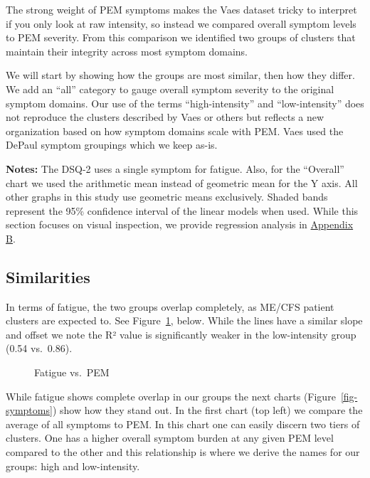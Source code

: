 \documentclass[
  letterpaper,
  DIV=11,
  numbers=noendperiod]{scrartcl}
\begin{document}
The strong weight of PEM symptoms makes the Vaes dataset tricky to
interpret if you only look at raw intensity, so instead we compared
overall symptom levels to PEM severity. From this comparison we
identified two groups of clusters that maintain their integrity across
most symptom domains.

We will start by showing how the groups are most similar, then how they
differ. We add an ``all'' category to gauge overall symptom severity to
the original symptom domains. Our use of the terms ``high-intensity''
and ``low-intensity'' does not reproduce the clusters described by Vaes
or others but reflects a new organization based on how symptom domains
scale with PEM. Vaes used the DePaul symptom groupings which we keep
as-is.

\textbf{Notes:} The DSQ-2 uses a single symptom for fatigue. Also, for
the ``Overall'' chart we used the arithmetic mean instead of geometric
mean for the Y axis. All other graphs in this study use geometric means
exclusively. Shaded bands represent the 95\% confidence interval of the
linear models when used. While this section focuses on visual
inspection, we provide regression analysis in
\hyperref[sec-regression]{Appendix B}.

\subsection{Similarities}\label{sec-similar}

In terms of fatigue, the two groups overlap completely, as ME/CFS
patient clusters are expected to. See Figure~\ref{fig-fatigue}, below.
While the lines have a similar slope and offset we note the R² value is
significantly weaker in the low-intensity group (0.54 vs.~0.86).

\begin{figure}[h]


\caption{\label{fig-fatigue}Fatigue vs.~PEM}

\end{figure}%

\FloatBarrier

While fatigue shows complete overlap in our groups the next charts
(Figure~\ref{fig-symptoms}) show how they stand out. In the first chart
(top left) we compare the average of all symptoms to PEM. In this chart
one can easily discern two tiers of clusters. One has a higher overall
symptom burden at any given PEM level compared to the other and this
relationship is where we derive the names for our groups: high and
low-intensity.
\end{document}

